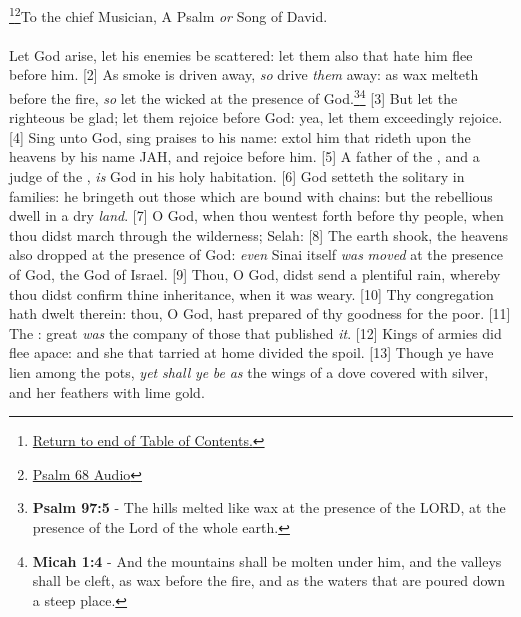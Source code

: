 \footnote{\textcolor[rgb]{0.00,0.25,0.00}{\hyperlink{TOC}{Return to end of Table of Contents.}}}\footnote{\href{https://audiobible.com/bible/psalms_68.html}{\textcolor[cmyk]{0.99998,1,0,0}{Psalm 68 Audio}}}\textcolor[cmyk]{0.99998,1,0,0}{To the chief Musician, A Psalm \emph{or} Song of David.}\\
\\
\textcolor[cmyk]{0.99998,1,0,0}{Let God arise, let his enemies be scattered: let them also that hate him flee before him.}
[2] \textcolor[cmyk]{0.99998,1,0,0}{As smoke is driven away, \emph{so} drive \emph{them} away: as wax melteth before the fire, \emph{so} let the wicked   at the presence of God.}\footnote{\textbf{Psalm 97:5} - The hills melted like wax at the presence of the LORD, at the presence of the Lord of the whole earth.}\footnote{\textbf{Micah 1:4} - And the mountains shall be molten under him, and the valleys shall be cleft, as wax before the fire, and as the waters that are poured down a steep place.}
[3] \textcolor[cmyk]{0.99998,1,0,0}{But let the righteous be glad; let them rejoice before God: yea, let them exceedingly rejoice.}
[4] \textcolor[cmyk]{0.99998,1,0,0}{Sing unto God, sing praises to his name: extol him that rideth upon the heavens by his name JAH, and rejoice before him.}
[5] \textcolor[cmyk]{0.99998,1,0,0}{A father of the  , and a judge of the  , \emph{is} God in his holy habitation.}
[6] \textcolor[cmyk]{0.99998,1,0,0}{God setteth the solitary in families: he bringeth out those which are bound with chains: but the rebellious dwell in a dry \emph{land}.}
[7] \textcolor[cmyk]{0.99998,1,0,0}{O God, when thou wentest forth before thy people, when thou didst march through the wilderness; Selah:}
[8] \textcolor[cmyk]{0.99998,1,0,0}{The earth shook, the heavens also dropped at the presence of God: \emph{even} Sinai itself \emph{was} \emph{moved} at the presence of God, the God of Israel.}
[9] \textcolor[cmyk]{0.99998,1,0,0}{Thou, O God, didst send a plentiful rain, whereby thou didst confirm thine inheritance, when it was weary.}
[10] \textcolor[cmyk]{0.99998,1,0,0}{Thy congregation hath dwelt therein: thou, O God, hast prepared of thy goodness for the poor.}
[11] \textcolor[cmyk]{0.99998,1,0,0}{The  : great \emph{was} the company of those that published \emph{it}.}
[12] \textcolor[cmyk]{0.99998,1,0,0}{Kings of armies did flee apace: and she that tarried at home divided the spoil.}
[13] \textcolor[cmyk]{0.99998,1,0,0}{Though ye have lien among the pots, \emph{yet} \emph{shall} \emph{ye} \emph{be} \emph{as} the wings of a dove covered with silver, and her feathers with lime gold.}
